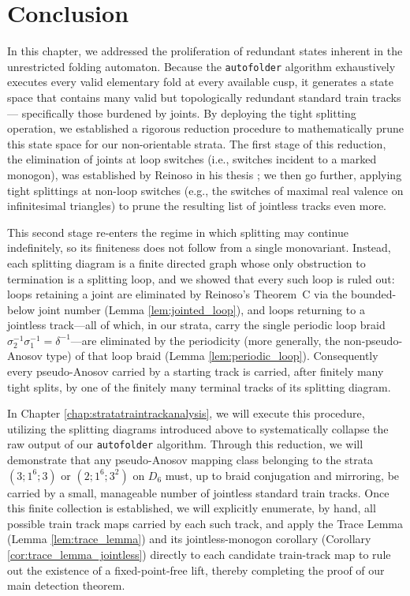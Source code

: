 \section{Conclusion}

In this chapter, we addressed the proliferation of redundant states inherent in the unrestricted folding automaton. Because the \texttt{autofolder} algorithm exhaustively executes every valid elementary fold at every available cusp, it generates a state space that contains many valid but topologically redundant standard train tracks --- specifically those burdened by joints. By deploying the tight splitting operation, we established a rigorous reduction procedure to mathematically prune this state space for our non-orientable strata. The first stage of this reduction, the elimination of joints at loop switches (i.e., switches incident to a marked monogon), was established by Reinoso in his thesis \cite{reinoso2024pseudo}; we then go further, applying tight splittings at non-loop switches (e.g., the switches of maximal real valence on infinitesimal triangles) to prune the resulting list of jointless tracks even more.

This second stage re-enters the regime in which splitting may continue indefinitely, so its finiteness does not follow from a single monovariant. Instead, each splitting diagram is a finite directed graph whose only obstruction to termination is a splitting loop, and we showed that every such loop is ruled out: loops retaining a joint are eliminated by Reinoso's Theorem~C via the bounded-below joint number (Lemma \ref{lem:jointed_loop}), and loops returning to a jointless track---all of which, in our strata, carry the single periodic loop braid $\sigma_2^{-1}\sigma_1^{-1} = \delta^{-1}$---are eliminated by the periodicity (more generally, the non-pseudo-Anosov type) of that loop braid (Lemma \ref{lem:periodic_loop}). Consequently every pseudo-Anosov carried by a starting track is carried, after finitely many tight splits, by one of the finitely many terminal tracks of its splitting diagram.

In Chapter \ref{chap:stratatraintrackanalysis}, we will execute this procedure, utilizing the splitting diagrams introduced above to systematically collapse the raw output of our \texttt{autofolder} algorithm. Through this reduction, we will demonstrate that any pseudo-Anosov mapping class belonging to the strata $(3;1^6;3)$ or $(2;1^6;3^2)$ on $D_6$ must, up to braid conjugation and mirroring, be carried by a small, manageable number of jointless standard train tracks. Once this finite collection is established, we will explicitly enumerate, by hand, all possible train track maps carried by each such track, and apply the Trace Lemma (Lemma \ref{lem:trace_lemma}) and its jointless-monogon corollary (Corollary \ref{cor:trace_lemma_jointless}) directly to each candidate train-track map to rule out the existence of a fixed-point-free lift, thereby completing the proof of our main detection theorem.